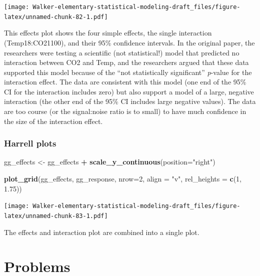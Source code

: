 \documentclass[]{book}
\newenvironment{Shaded}{\begin{snugshade}}{\end{snugshade}}
\newcommand{\KeywordTok}[1]{\textcolor[rgb]{0.13,0.29,0.53}{\textbf{#1}}}
\newcommand{\DataTypeTok}[1]{\textcolor[rgb]{0.13,0.29,0.53}{#1}}
\newcommand{\DecValTok}[1]{\textcolor[rgb]{0.00,0.00,0.81}{#1}}
\newcommand{\FloatTok}[1]{\textcolor[rgb]{0.00,0.00,0.81}{#1}}
\newcommand{\StringTok}[1]{\textcolor[rgb]{0.31,0.60,0.02}{#1}}
\newcommand{\OperatorTok}[1]{\textcolor[rgb]{0.81,0.36,0.00}{\textbf{#1}}}
\newcommand{\NormalTok}[1]{#1}
\begin{document}
\texttt{[image: Walker-elementary-statistical-modeling-draft\_files/figure-latex/unnamed-chunk-82-1.pdf]}

This effects plot shows the four simple effects, the single interaction
(Temp18:CO21100), and their 95\% confidence intervals. In the original
paper, the researchers were testing a scientific (not statistical!)
model that predicted no interaction between CO2 and Temp, and the
researchers argued that these data supported this model because of the
``not statistically significant'' \emph{p}-value for the interaction
effect. The data are consistent with this model (one end of the 95\% CI
for the interaction includes zero) but also support a model of a large,
negative interaction (the other end of the 95\% CI includes large
negative values). The data are too course (or the signal:noise ratio is
to small) to have much confidence in the size of the interaction effect.

\subsubsection{Harrell plots}\label{harrell-plots}

\begin{Shaded}
\begin{Highlighting}[]
\NormalTok{gg_effects <-}\StringTok{ }\NormalTok{gg_effects }\OperatorTok{+}\StringTok{ }\KeywordTok{scale_y_continuous}\NormalTok{(}\DataTypeTok{position=}\StringTok{"right"}\NormalTok{)}

\KeywordTok{plot_grid}\NormalTok{(gg_effects, gg_response, }\DataTypeTok{nrow=}\DecValTok{2}\NormalTok{, }
          \DataTypeTok{align =} \StringTok{"v"}\NormalTok{, }
          \DataTypeTok{rel_heights =} \KeywordTok{c}\NormalTok{(}\DecValTok{1}\NormalTok{, }\FloatTok{1.75}\NormalTok{))}
\end{Highlighting}
\end{Shaded}

\texttt{[image: Walker-elementary-statistical-modeling-draft\_files/figure-latex/unnamed-chunk-83-1.pdf]}

The effects and interaction plot are combined into a single plot.

\section{Problems}\label{problems-3}
\end{document}
